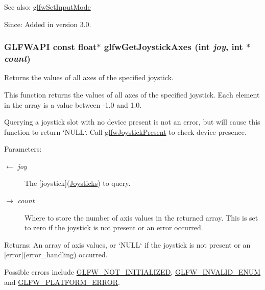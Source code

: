 \begin{Desc}
\item[See also:]\hyperlink{group__input_ge1eb729d2dd91dc33fd60e150a6e1684}{glfwSetInputMode}\end{Desc}
\begin{Desc}
\item[Since:]Added in version 3.0. \end{Desc}
\hypertarget{group__input_gab9e573d808b088c5079c0f577d39448}{
\subsubsection[glfwGetJoystickAxes]{\setlength{\rightskip}{0pt plus 5cm}GLFWAPI const float$\ast$ glfwGetJoystickAxes (int {\em joy}, \/  int $\ast$ {\em count})}}
\label{group__input_gab9e573d808b088c5079c0f577d39448}


Returns the values of all axes of the specified joystick. 

This function returns the values of all axes of the specified joystick. Each element in the array is a value between -1.0 and 1.0.

Querying a joystick slot with no device present is not an error, but will cause this function to return `NULL`. Call \hyperlink{group__input_g7f81f22f355f4b7d315caf73cdfd9906}{glfwJoystickPresent} to check device presence.

\begin{Desc}
\item[Parameters:]
\begin{description}
\item[\mbox{$\leftarrow$} {\em joy}]The \mbox{[}joystick\mbox{]}(\hyperlink{group__joysticks}{Joysticks}) to query. \item[\mbox{$\rightarrow$} {\em count}]Where to store the number of axis values in the returned array. This is set to zero if the joystick is not present or an error occurred. \end{description}
\end{Desc}
\begin{Desc}
\item[Returns:]An array of axis values, or `NULL` if the joystick is not present or an \mbox{[}error\mbox{]}(error\_\-handling) occurred.\end{Desc}
Possible errors include \hyperlink{group__errors_g2374ee02c177f12e1fa76ff3ed15e14a}{GLFW\_\-NOT\_\-INITIALIZED}, \hyperlink{group__errors_g76f6bb9c4eea73db675f096b404593ce}{GLFW\_\-INVALID\_\-ENUM} and \hyperlink{group__errors_gd44162d78100ea5e87cdd38426b8c7a1}{GLFW\_\-PLATFORM\_\-ERROR}.

